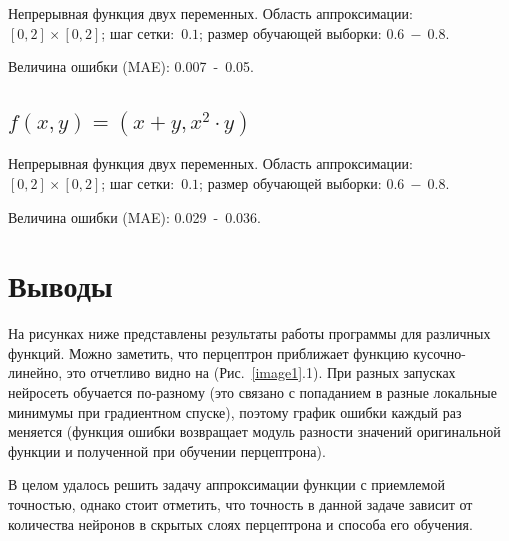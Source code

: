 \documentclass[12pt, a4paper]{article}
\begin{document}
    Непрерывная функция двух переменных. Область аппроксимации:~$[0, 2] 
    \times [0, 2]$; шаг сетки:~$0.1$; размер обучающей выборки: $0.6~-~0.8$.
    
    Величина ошибки (MAE): 0.007~-~0.05.
    
    \subsection{$f(x, y) = (x + y, x^2 \cdot y)$}
    
    Непрерывная функция двух переменных. Область аппроксимации:~$[0, 2] 
    \times [0, 2]$; шаг сетки:~$0.1$; размер обучающей выборки: $0.6~-~0.8$.
    
    Величина ошибки (MAE): 0.029~-~0.036.
    
    \section{Выводы}
    
    На рисунках ниже представлены результаты работы программы для различных 
    функций. Можно заметить, что перцептрон приближает функцию 
    кусочно-линейно, это отчетливо видно на (Рис.~\ref{image1}.1). При 
    разных запусках нейросеть обучается по-разному (это связано с попаданием 
    в разные локальные минимумы при градиентном спуске), поэтому график 
    ошибки каждый раз меняется (функция ошибки возвращает модуль разности 
    значений оригинальной функции и полученной при обучении перцептрона).
    
    В целом удалось решить задачу аппроксимации функции с приемлемой 
    точностью, однако стоит отметить, что точность в данной задаче зависит 
    от количества нейронов в скрытых слоях перцептрона и способа его 
    обучения.
    
\end{document}
